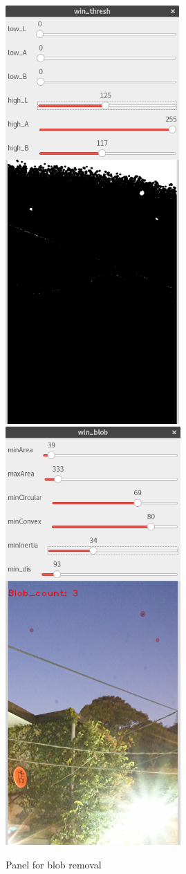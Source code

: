 \documentclass[11pt]{article}
\begin{document}
\begin{figure}[!ht]
  \centering
  \includegraphics[height=16cm]{blob-panel1}
  \includegraphics[height=16cm]{blob-panel2}
  \caption{Panel for blob removal}
  \label{fig:blob-panel}
\end{figure}
\end{document}
